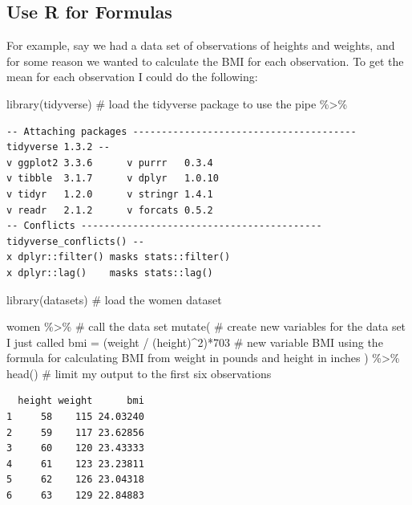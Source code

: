 \documentclass[
  letterpaper,
  DIV=11,
  numbers=noendperiod]{scrreprt}
\newenvironment{Shaded}{\begin{snugshade}}{\end{snugshade}}
\newcommand{\AttributeTok}[1]{\textcolor[rgb]{0.40,0.45,0.13}{#1}}
\newcommand{\CommentTok}[1]{\textcolor[rgb]{0.37,0.37,0.37}{#1}}
\newcommand{\DecValTok}[1]{\textcolor[rgb]{0.68,0.00,0.00}{#1}}
\newcommand{\FunctionTok}[1]{\textcolor[rgb]{0.28,0.35,0.67}{#1}}
\newcommand{\NormalTok}[1]{\textcolor[rgb]{0.00,0.23,0.31}{#1}}
\newcommand{\SpecialCharTok}[1]{\textcolor[rgb]{0.37,0.37,0.37}{#1}}
\begin{document}
\hypertarget{use-r-for-formulas}{%
\subsection{Use R for Formulas}\label{use-r-for-formulas}}

For example, say we had a data set of observations of heights and
weights, and for some reason we wanted to calculate the BMI for each
observation. To get the mean for each observation I could do the
following:

\begin{Shaded}
\begin{Highlighting}[]
\FunctionTok{library}\NormalTok{(tidyverse) }\CommentTok{\# load the tidyverse package to use the pipe \%\textgreater{}\%}
\end{Highlighting}
\end{Shaded}

\begin{verbatim}
-- Attaching packages --------------------------------------- tidyverse 1.3.2 --
v ggplot2 3.3.6      v purrr   0.3.4 
v tibble  3.1.7      v dplyr   1.0.10
v tidyr   1.2.0      v stringr 1.4.1 
v readr   2.1.2      v forcats 0.5.2 
-- Conflicts ------------------------------------------ tidyverse_conflicts() --
x dplyr::filter() masks stats::filter()
x dplyr::lag()    masks stats::lag()
\end{verbatim}

\begin{Shaded}
\begin{Highlighting}[]
\FunctionTok{library}\NormalTok{(datasets) }\CommentTok{\# load the women dataset}

\NormalTok{women }\SpecialCharTok{\%\textgreater{}\%} \CommentTok{\# call the data set}
  \FunctionTok{mutate}\NormalTok{( }\CommentTok{\# create new variables for the data set I just called}
    \AttributeTok{bmi =}\NormalTok{ (weight }\SpecialCharTok{/}\NormalTok{ (height)}\SpecialCharTok{\^{}}\DecValTok{2}\NormalTok{)}\SpecialCharTok{*}\DecValTok{703} \CommentTok{\# new variable BMI using the formula for calculating BMI from weight in pounds and height in inches}
\NormalTok{  ) }\SpecialCharTok{\%\textgreater{}\%}
  \FunctionTok{head}\NormalTok{() }\CommentTok{\# limit my output to the first six observations}
\end{Highlighting}
\end{Shaded}

\begin{verbatim}
  height weight      bmi
1     58    115 24.03240
2     59    117 23.62856
3     60    120 23.43333
4     61    123 23.23811
5     62    126 23.04318
6     63    129 22.84883
\end{verbatim}
\end{document}
